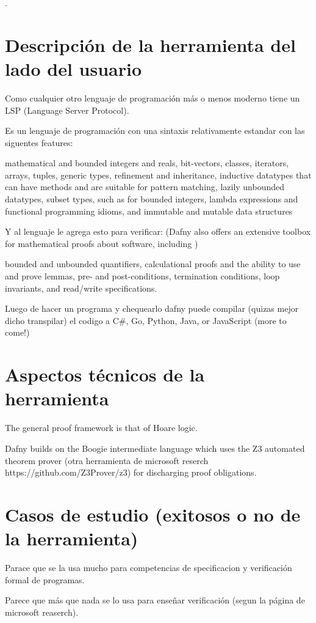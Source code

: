 \documentclass[runningheads]{llncs}
\begin{document}
.

\section{Descripción de la herramienta del lado del usuario}
Como cualquier otro lenguaje de programación más o menos moderno tiene un LSP (Language Server Protocol).

Es un lenguaje de programación con una sintaxis relativamente estandar con las siguentes features:

mathematical and bounded integers and reals, bit-vectors, classes, iterators, arrays, tuples, generic types, refinement and inheritance,
inductive datatypes that can have methods and are suitable for pattern matching,
lazily unbounded datatypes,
subset types, such as for bounded integers,
lambda expressions and functional programming idioms,
and immutable and mutable data structures

Y al lenguaje le agrega esto para verificar: (Dafny also offers an extensive toolbox for mathematical proofs about software, including
)

bounded and unbounded quantifiers,
calculational proofs and the ability to use and prove lemmas,
pre- and post-conditions, termination conditions, loop invariants, and read/write specifications.

Luego de hacer un programa y chequearlo dafny puede compilar (quizas mejor dicho transpilar) el codigo a C\#, Go, Python, Java, or JavaScript (more to come!)

\section{Aspectos técnicos de la herramienta}
The general proof framework is that of Hoare logic.

Dafny builds on the Boogie intermediate language
which uses the Z3 automated theorem prover
(otra herramienta de microsoft reserch https://github.com/Z3Prover/z3) for discharging proof obligations.

\section{Casos de estudio (exitosos o no de la herramienta)}
Parace que se la usa mucho para competencias de specificacion y verificación formal de programas.

Parece que más que nada se lo usa para enseñar verificación (segun la página de microsoft reaserch).
\end{document}
